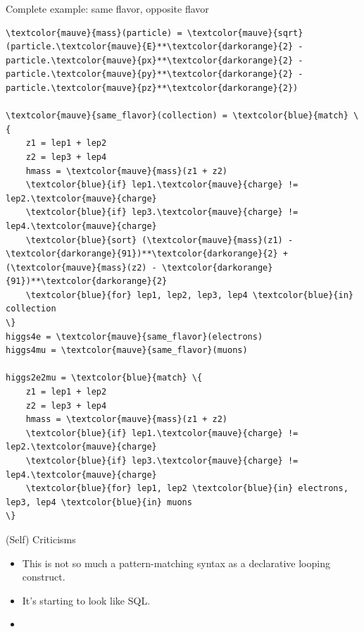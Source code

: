 \documentclass[aspectratio=169]{beamer}
\begin{document}
\begin{frame}[fragile]{Complete example: same flavor, opposite flavor}
\scriptsize
\vspace{0.25 cm}
\begin{Verbatim}[commandchars=\\\{\}]
\textcolor{mauve}{mass}(particle) = \textcolor{mauve}{sqrt}(particle.\textcolor{mauve}{E}**\textcolor{darkorange}{2} - particle.\textcolor{mauve}{px}**\textcolor{darkorange}{2} - particle.\textcolor{mauve}{py}**\textcolor{darkorange}{2} - particle.\textcolor{mauve}{pz}**\textcolor{darkorange}{2})

\textcolor{mauve}{same_flavor}(collection) = \textcolor{blue}{match} \{
    z1 = lep1 + lep2
    z2 = lep3 + lep4
    hmass = \textcolor{mauve}{mass}(z1 + z2)
    \textcolor{blue}{if} lep1.\textcolor{mauve}{charge} != lep2.\textcolor{mauve}{charge}
    \textcolor{blue}{if} lep3.\textcolor{mauve}{charge} != lep4.\textcolor{mauve}{charge}
    \textcolor{blue}{sort} (\textcolor{mauve}{mass}(z1) - \textcolor{darkorange}{91})**\textcolor{darkorange}{2} + (\textcolor{mauve}{mass}(z2) - \textcolor{darkorange}{91})**\textcolor{darkorange}{2}
    \textcolor{blue}{for} lep1, lep2, lep3, lep4 \textcolor{blue}{in} collection
\}
higgs4e = \textcolor{mauve}{same_flavor}(electrons)
higgs4mu = \textcolor{mauve}{same_flavor}(muons)

higgs2e2mu = \textcolor{blue}{match} \{
    z1 = lep1 + lep2
    z2 = lep3 + lep4
    hmass = \textcolor{mauve}{mass}(z1 + z2)
    \textcolor{blue}{if} lep1.\textcolor{mauve}{charge} != lep2.\textcolor{mauve}{charge}
    \textcolor{blue}{if} lep3.\textcolor{mauve}{charge} != lep4.\textcolor{mauve}{charge}
    \textcolor{blue}{for} lep1, lep2 \textcolor{blue}{in} electrons, lep3, lep4 \textcolor{blue}{in} muons
\}
\end{Verbatim}
\end{frame}

\begin{frame}{(Self) Criticisms}
\Large
\vspace{0.5 cm}
\begin{itemize}
\item This is not so much a pattern-matching syntax as a declarative looping construct.
\item It's starting to look like SQL.
\item 


\end{itemize}
\end{frame}
\end{document}
